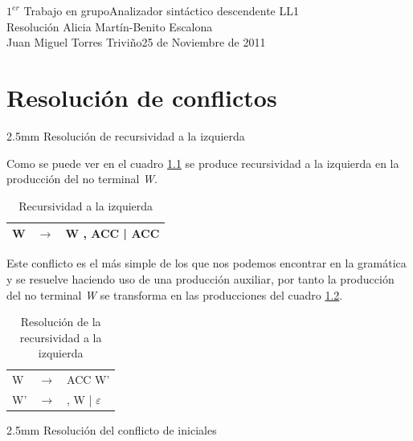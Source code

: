 \documentclass[11pt,a4paper,spanish,twoside]{book}
\makeatletter
\renewcommand{\section}{
  \@startsection{section}{1}{0mm}{\baselineskip}
  {2.5mm}{\Large\bf}
}
\theoremstyle{plain} \newtheorem{nota}{Nota}
\makeatother
\begin{document}
{$1^{er}$ Trabajo en grupo}{Analizador sintáctico descendente LL1\\Resolución}
{Alicia Martín-Benito Escalona\\Juan Miguel Torres Triviño}{25 de Noviembre de 
2011}  


\tableofcontents
\listoftables
\listoffigures

\chapter{Resolución de conflictos}

\section{Resolución de recursividad a la izquierda}

Como se puede ver en el cuadro \ref{rec} se produce recursividad a la izquierda
en la producción del no terminal \emph{W}.
\begin{table}[!ht]
  \centering
  \begin{tabular}{lll}
    \hline
    W   & $\to$ & W , ACC | ACC\\
    \hline
  \end{tabular}
  \caption{Recursividad a la izquierda}\label{rec}
\end{table}

Este conflicto es el más simple de los que nos podemos encontrar en la gramática
y se resuelve haciendo uso de una producción auxiliar, por tanto la producción 
del no terminal \emph{W} se transforma en las producciones del cuadro 
\ref{rec1}.

\begin{table}[!ht]
  \centering
  \begin{tabular}{lll}
    \hline
    W   & $\to$ & ACC W'\\
    W'  & $\to$ & , W | $\varepsilon$\\
    \hline
  \end{tabular}
  \caption{Resolución de la recursividad a la izquierda}\label{rec1}
\end{table}

\section{Resolución del conflicto de iniciales}
\end{document}
